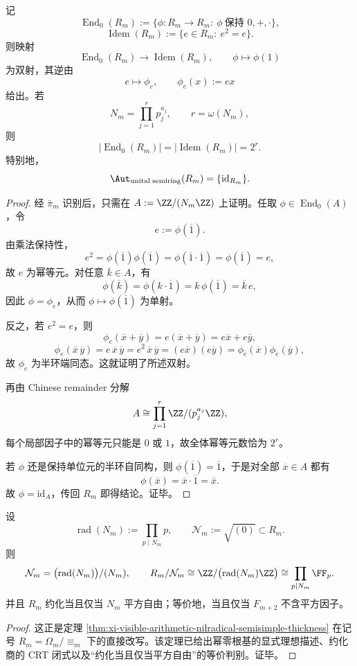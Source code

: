 \begin{theorem}[分辨率商半环的非幺端同态与幺自同构刚性]\label{thm:xi-fold-congruence-unital-automorphism-rigidity}
记
\[
\operatorname{End}_0(R_m)
:=
\{\phi:R_m\to R_m:\ \phi\ \text{保持 }0,+,\cdot\},
\]
\[
\operatorname{Idem}(R_m)
:=
\{e\in R_m:\ e^2=e\}.
\]
则映射
\[
\operatorname{End}_0(R_m)\longrightarrow \operatorname{Idem}(R_m),
\qquad
\phi\longmapsto \phi(1)
\]
为双射，其逆由
\[
e\longmapsto \phi_e,
\qquad
\phi_e(x):=ex
\]
给出。若
\[
N_m=\prod_{j=1}^{r}p_j^{a_j},
\qquad r=\omega(N_m),
\]
则
\[
|\operatorname{End}_0(R_m)|
=
|\operatorname{Idem}(R_m)|
=
2^r.
\]
特别地，
\[
\Aut_{\mathrm{unital\; semiring}}(R_m)=\{\mathrm{id}_{R_m}\}.
\]
\end{theorem}
\begin{proof}
经 \(\bar\pi_m\) 识别后，只需在 \(A:=\ZZ/(N_m\ZZ)\) 上证明。任取 \(\phi\in \operatorname{End}_0(A)\)，令
\[
e:=\phi(\overline 1).
\]
由乘法保持性，
\[
e^2=\phi(\overline 1)\phi(\overline 1)=\phi(\overline 1\cdot \overline 1)=\phi(\overline 1)=e,
\]
故 \(e\) 为幂等元。对任意 \(\overline k\in A\)，有
\[
\phi(\overline k)
=
\phi(k\cdot \overline 1)
=
k\,\phi(\overline 1)
=
\overline k\,e,
\]
因此 \(\phi=\phi_e\)，从而 \(\phi\mapsto \phi(\overline 1)\) 为单射。

反之，若 \(e^2=e\)，则
\[
\phi_e(\overline x+\overline y)=e(\overline x+\overline y)=e\overline x+e\overline y,
\]
\[
\phi_e(\overline x\,\overline y)=e\,\overline x\,\overline y
=
e^2\,\overline x\,\overline y
=
(e\overline x)(e\overline y)
=
\phi_e(\overline x)\phi_e(\overline y),
\]
故 \(\phi_e\) 为半环端同态。这就证明了所述双射。

再由 Chinese remainder 分解
\[
A\cong \prod_{j=1}^{r}\ZZ/(p_j^{a_j}\ZZ),
\]
每个局部因子中的幂等元只能是 \(0\) 或 \(1\)，故全体幂等元数恰为 \(2^r\)。

若 \(\phi\) 还是保持单位元的半环自同构，则 \(\phi(\overline 1)=\overline 1\)，于是对全部 \(\overline x\in A\) 都有
\[
\phi(\overline x)=\overline x\cdot \overline 1=\overline x.
\]
故 \(\phi=\mathrm{id}_A\)，传回 \(R_m\) 即得结论。证毕。
\end{proof}

\begin{theorem}\label{thm:xi-fold-congruence-nilradical-reduced-quotient}
设
\[
\operatorname{rad}(N_m):=\prod_{p\mid N_m}p,
\qquad
\mathcal N_m:=\sqrt{(0)}\subset R_m.
\]
则
\[
\mathcal N_m
=
\bigl(\operatorname{rad}(N_m)\bigr)/(N_m),
\qquad
R_m/\mathcal N_m
\cong
\ZZ/\bigl(\operatorname{rad}(N_m)\ZZ\bigr)
\cong
\prod_{p\mid N_m}\FF_p.
\]
并且 \(R_m\) 约化当且仅当 \(N_m\) 平方自由；等价地，当且仅当 \(F_{m+2}\) 不含平方因子。
\end{theorem}
\begin{proof}
这正是定理 \ref{thm:xi-visible-arithmetic-nilradical-semisimple-thickness} 在记号 \(R_m=\Omega_m/\!\equiv_m\) 下的直接改写。该定理已给出幂零根基的显式理想描述、约化商的 CRT 闭式以及“约化当且仅当平方自由”的等价判别。证毕。
\end{proof}

